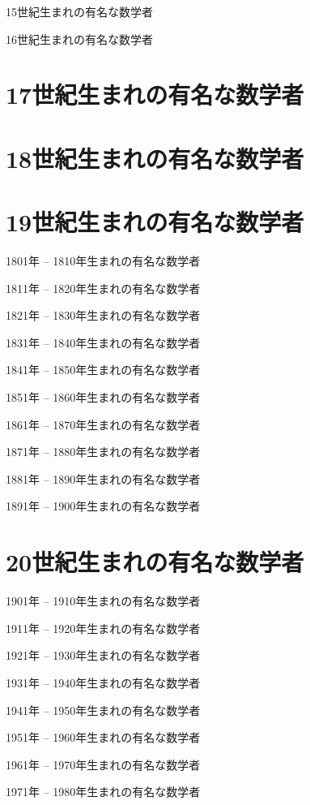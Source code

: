 \documentclass[a4paper,12pt]{jsarticle}
\theoremstyle{plain}
\theoremstyle{remark}  %
\theoremstyle{definition}  %
\begin{document}
15世紀生まれの有名な数学者

16世紀生まれの有名な数学者

\section{17世紀生まれの有名な数学者}

\section{18世紀生まれの有名な数学者}

\section{19世紀生まれの有名な数学者}
1801年 -- 1810年生まれの有名な数学者

1811年 -- 1820年生まれの有名な数学者

1821年 -- 1830年生まれの有名な数学者

1831年 -- 1840年生まれの有名な数学者

1841年 -- 1850年生まれの有名な数学者

1851年 -- 1860年生まれの有名な数学者

1861年 -- 1870年生まれの有名な数学者

1871年 -- 1880年生まれの有名な数学者

1881年 -- 1890年生まれの有名な数学者

1891年 -- 1900年生まれの有名な数学者

\section{20世紀生まれの有名な数学者}
1901年 -- 1910年生まれの有名な数学者

1911年 -- 1920年生まれの有名な数学者

1921年 -- 1930年生まれの有名な数学者

1931年 -- 1940年生まれの有名な数学者

1941年 -- 1950年生まれの有名な数学者

1951年 -- 1960年生まれの有名な数学者

1961年 -- 1970年生まれの有名な数学者

1971年 -- 1980年生まれの有名な数学者




\end{document}

